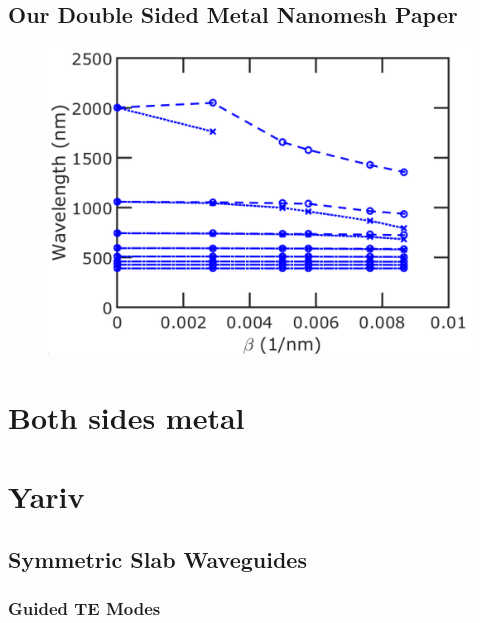 \documentclass[12pt]{article}
\numberwithin{equation}{section}
\begin{document}
\subsection{Our Double Sided Metal Nanomesh Paper}

\begin{figure}[H]
\centering 
\vspace{-10pt}
\includegraphics[scale=.4]{Figures/DoubleSidedMetalNanomeshPaper}
\vspace{-10pt}
\end{figure}



\section{Both sides metal}

\section{Yariv}

\subsection{Symmetric Slab Waveguides}
\subsubsection{Guided TE Modes}
\end{document}
